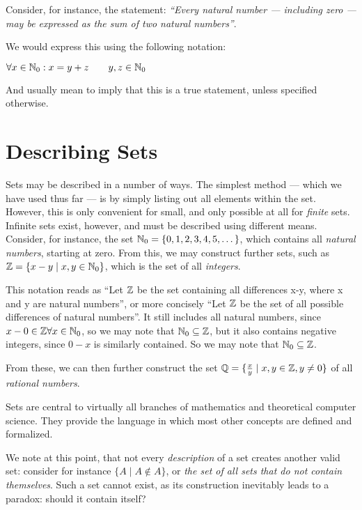  \begin{example}
   [Quantifiers]
 Consider, for instance, the statement: \emph{``Every natural number --- including
 zero ---  may be expressed as the sum of two natural numbers''}.

We would express this using the following notation:
\begin{center}
  \(\forall x \in \mathbb{N}_0 : x = y + z \qquad y,z\in\mathbb{N}_0\)
\end{center}

And usually mean to imply that this is a true statement, unless specified otherwise.
\end{example}

\section{Describing Sets}
Sets may be described in a number of ways.
The simplest method --- which we have used thus far --- is by simply listing out
all elements within the set.
However, this is only convenient for small, and only possible at all for
\emph{finite} sets.
Infinite sets exist, however, and must be described using different means.
Consider, for instance, the set \(\mathbb{N}_{0} = \{0,1,2,3,4,5,\dots\}\),
which contains all \emph{natural numbers}, starting at zero.
From this, we may construct further sets, such as
\(\mathbb{Z} = \{x-y \mid x, y \in \mathbb{N}_0\}\), which is the set of all
\emph{integers}.
\begin{remark}
  This notation reads as ``Let \(\mathbb{Z}\) be the set containing all differences
  x-y, where x and y are natural numbers'', or more concisely ``Let \(\mathbb{Z}\)
  be the set of all possible differences of natural numbers''. It still includes
  all natural numbers, since \(x - 0 \in \mathbb{Z} \forall x \in \mathbb{N}_0\), so we may
  note that \(\mathbb{N}_0 \subseteq \mathbb{Z}\), but it also contains negative integers, since \(0 - x\)
  is similarly contained.
  So we may note that \(\mathbb{N}_0 \subseteq \mathbb{Z}\).
\end{remark}

From these, we can then further construct the set
\(\mathbb{Q} = \{\frac{x}{y} \mid x,y \in \mathbb{Z}, y \neq 0\}\) of all
\emph{rational numbers}.

Sets are central to virtually all branches of mathematics and theoretical
computer science. They provide the language in which most other concepts are
defined and formalized.

We note at this point, that not every \emph{description} of a set creates
another valid set: consider for instance \(\{A \mid A \notin A\}\), or \emph{the
set of all sets that do not contain themselves}. Such a set cannot exist, as its
construction inevitably leads to a paradox: should it contain itself?

